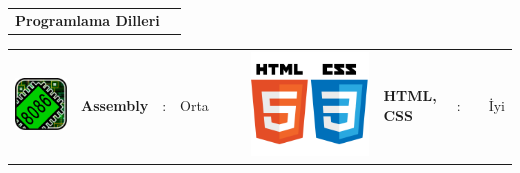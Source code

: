 \documentclass[paper=a4,fontsize=11pt]{temp} %
\begin{document}
\hspace{3mm}
\begin{minipage}[t]{0.33\textwidth} 

\begin{tabular}[t]{ l l }
\textbf{Programlama Dilleri}
\end{tabular}

\sepspace

\end{minipage}
%
\begin{minipage}[t]{0.66\textwidth} 



\begin{tabular}{lllllllllll}
\includegraphics[scale=0.035]{IMG/languages/assembly} & \textbf{Assembly} & : & Orta  &  &  & \includegraphics[scale=0.03]{IMG/languages/htmlCss} & \textbf{HTML, CSS}  & : &  & İyi   \\

\end{tabular}
\end{minipage}
\end{document}
